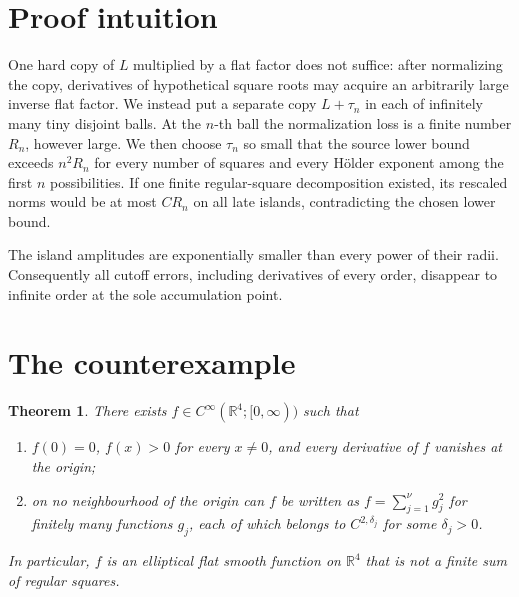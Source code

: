 \documentclass[11pt]{article}
\newtheorem{theorem}{Theorem}
\newcommand{\R}{\mathbb R}
\begin{document}
\section{Proof intuition}

One hard copy of \(L\) multiplied by a flat factor does not suffice: after
normalizing the copy, derivatives of hypothetical square roots may acquire
an arbitrarily large inverse flat factor.  We instead put a separate copy
\(L+\tau_n\) in each of infinitely many tiny disjoint balls.  At the
\(n\)-th ball the normalization loss is a finite number \(R_n\), however
large.  We then choose \(\tau_n\) so small that the source lower bound exceeds
\(n^2R_n\) for every number of squares and every H\"older exponent among the
first \(n\) possibilities.  If one finite regular-square decomposition
existed, its rescaled norms would be at most \(CR_n\) on all late islands,
contradicting the chosen lower bound.

The island amplitudes are exponentially smaller than every power of their
radii.  Consequently all cutoff errors, including derivatives of every
order, disappear to infinite order at the sole accumulation point.

\section{The counterexample}

\begin{theorem}\label{thm:main}
There exists \(f\in C^\infty(\R^4;[0,\infty))\) such that
\begin{enumerate}
 \item \(f(0)=0\), \(f(x)>0\) for every \(x\neq0\), and every derivative of
 \(f\) vanishes at the origin;
 \item on no neighbourhood of the origin can \(f\) be written as
 \(f=\sum_{j=1}^{\nu}g_j^2\) for finitely many functions \(g_j\), each of
 which belongs to \(C^{2,\delta_j}\) for some \(\delta_j>0\).
\end{enumerate}
In particular, \(f\) is an elliptical flat smooth function on \(\R^4\) that
is not a finite sum of regular squares.
\end{theorem}
\end{document}
